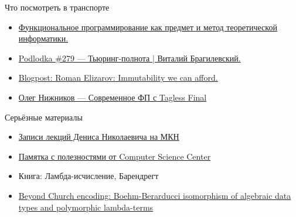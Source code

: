 
    \begin{frame}{Что посмотреть в транспорте}
        \begin{itemize}
            \item \href{https://youtu.be/oiUO1L4TOLI}{\color{blue} Функциональное программирование как предмет и метод теоретической информатики.}
            \item \href{https://youtu.be/YWelsG4mbik}{\color{blue} Podlodka \#279 --- Тьюринг-полнота | Виталий Брагилевский.}
            \item \href{https://elizarov.medium.com/immutability-we-can-afford-10c0dcb8351d}{\color{blue} Blogpost: Roman Elizarov: Immutability we can afford.}
            \item \href{https://youtu.be/sWEtnq0ReZA?si=98-MR2DbAc_LFWV1}{\color{blue} Олег Нижников --- Современное ФП с Tagless Final}
        \end{itemize}
    \end{frame}

    \begin{frame}{Серьёзные материалы}
        \begin{itemize}
            \item \href{https://www.youtube.com/playlist?list=PL-_cKNuVAYAVX_q9XOKoFm95234G6YfOj}{\color{blue} Записи лекций Дениса Николаевича на МКН}
            \item \href{https://compscicenter.notion.site/compscicenter/b6dddf00bc7d497298179a3bdbdda375}{\color{blue}Памятка с полезностями от Computer Science Center}
            \item Книга: Ламбда-исчисление, Барендрегт
            \item \href{https://okmij.org/ftp/tagless-final/course/Boehm-Berarducci.html}{\color{blue} Beyond Church encoding: Boehm-Berarducci isomorphism of algebraic data types and polymorphic lambda-terms}
        \end{itemize}
    \end{frame}


